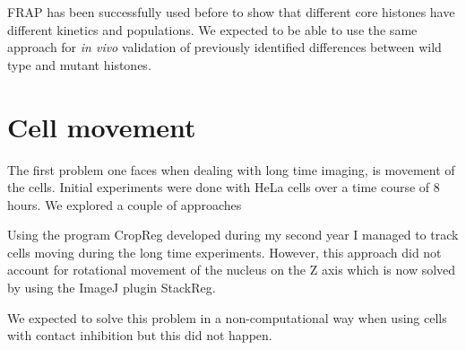   FRAP has been successfully used before to show that different core histones have
  different kinetics and populations. We expected to be able to use the same approach
  for \textit{in vivo} validation of previously identified differences between
  wild type and mutant histones.


\section{Cell movement}

  The first problem one faces when dealing with long time imaging, is movement of the cells.
  Initial experiments were done with HeLa cells over a time course of 8 hours. We explored
  a couple of approaches
  

  Using the program CropReg developed during my second year I managed to
  track cells moving during the long time experiments. However, this approach
  did not account for rotational movement of the nucleus on the Z axis which
  is now solved by using the ImageJ plugin StackReg.

  We expected to solve this problem in a non-computational way when using
  cells with contact inhibition but this did not happen.




